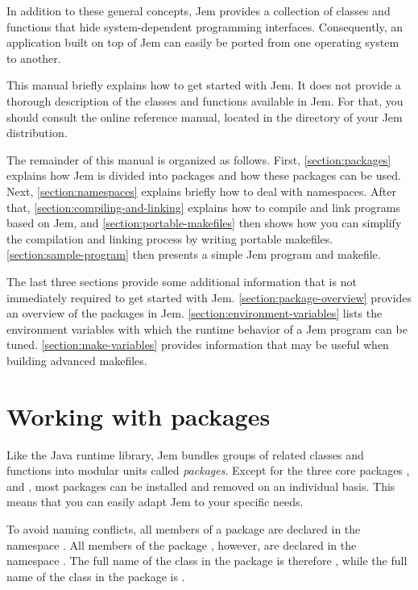 \documentclass[a4paper,10pt]{article}
\begin{document}
In addition to these general concepts, Jem provides a collection of
classes and functions that hide system-dependent programming interfaces.
Consequently, an application built on top of Jem can easily be ported
from one operating system to another.

This manual briefly explains how to get started with Jem. It does not
provide a thorough description of the classes and functions available in
Jem. For that, you should consult the online reference manual, located in
the directory  of your Jem distribution.

The remainder of this manual is organized as follows. First,
\autoref{section:packages} explains how Jem is divided into packages and
how these packages can be used. Next, \autoref{section:namespaces}
explains briefly how to deal with namespaces. After that,
\autoref{section:compiling-and-linking} explains how to compile and link
programs based on Jem, and \autoref{section:portable-makefiles} then
shows how you can simplify the compilation and linking process by writing
portable makefiles. \autoref{section:sample-program} then presents a
simple Jem program and makefile.

The last three sections provide some additional information that is not
immediately required to get started with Jem.
\autoref{section:package-overview} provides an overview of the packages
in Jem. \autoref{section:environment-variables} lists the environment
variables with which the runtime behavior of a Jem program can be tuned.
\autoref{section:make-variables} provides information that may be useful
when building advanced makefiles.


\section{Working with packages \label{section:packages}}

Like the Java runtime library, Jem bundles groups of related classes and
functions into modular units called \emph{packages}. Except for the three
core packages ,  and , most packages can
be installed and removed on an individual basis. This means that you can
easily adapt Jem to your specific needs.

To avoid naming conflicts, all members of a package are declared in the
namespace . All members of the package
, however, are declared in the namespace . The full
name of the class  in the package  is therefore
, while the full name of the class
 in the package  is
.
\end{document}
